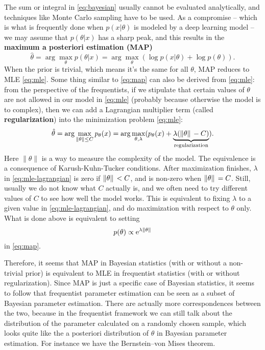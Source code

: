\documentclass[hyperref, a4paper, 12pt]{report}
\newcommand*{\ee}{\mathrm{e}}
\newcommand*{\argmax}{\arg\max}
\newcommand*{\concept}[1]{{\textbf{#1}}}
\begin{document}
The sum or integral in \eqref{eq:bayesian} usually cannot be evaluated analytically,
and techniques like Monte Carlo sampling have to be used.
As a compromise -- which is what is frequently done when $p(x | \theta)$ is modeled by a deep learning model
-- we may assume that $p(\theta | x)$ has a sharp peak,
and this results in the \concept{maximum a posteriori estimation (MAP)}
\begin{equation}
    \hat{\theta} = \argmax_\theta p(\theta | x) = \argmax_\theta (\log p(x | \theta) + \log p(\theta)).
    \label{eq:map}
\end{equation}
When the prior is trivial, which means it's the same for all $\theta$,
MAP reduces to MLE \eqref{eq:mle}.
Some thing similar to \eqref{eq:map} can also be derived from \eqref{eq:mle}:
from the perspective of the frequentists,
if we stipulate that certain values of $\theta$ are not allowed in our model in \eqref{eq:mle}
(probably because otherwise the model is to complex),
then we can add a Lagrangian multiplier term (called \concept{regularization}) into the minimization problem \eqref{eq:mle}:
\begin{equation}
    \hat{\theta} = \argmax_{\|\theta\| \leq C} p_\theta(x) = \argmax_{\theta, \lambda} (p_\theta(x) + \underbrace{\lambda (\norm*{\theta} - C)}_{\text{regularization}}).
    \label{eq:mle-lagrangian}
\end{equation}
Here $\|\theta\|$ is a way to measure the complexity of the model.
The equivalence is a consequence of Karush-Kuhn-Tucker conditions.
After maximization finishes, $\lambda$ in \eqref{eq:mle-lagrangian} is zero if $\norm*{\theta} < C$,
and is non-zero when $\norm*{\theta} = C$.
Still, usually we do not know what $C$ actually is,
and we often need to try different values of $C$ to see how well the model works.
This is equivalent to fixing $\lambda$ to a given value in \eqref{eq:mle-lagrangian},
and do maximization with respect to $\theta$ only.
What is done above is equivalent to setting
\begin{equation}
    p(\theta) \propto \ee^{\lambda \norm*{\theta}}
\end{equation}
in \eqref{eq:map}.

Therefore, it seems that MAP in Bayesian statistics (with or without a non-trivial prior)
is equivalent to MLE in frequentist statistics (with or without regularization).
Since MAP is just a specific case of Bayesian statistics,
it seems to follow that frequentist parameter estimation can be seen as a subset of Bayesian parameter estimation.
There are actually more correspondences between the two,
because in the frequentist framework we can still talk about
the distribution of the parameter calculated on a randomly chosen sample,
which looks quite like the a posteriori distribution of $\theta$ in Bayesian parameter estimation.
For instance we have the Bernstein–von Mises theorem.
\end{document}
